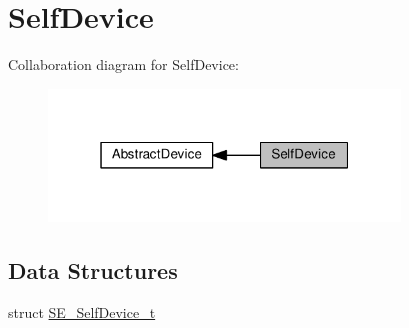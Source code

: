 \hypertarget{group__SelfDevice}{}\section{Self\+Device}
\label{group__SelfDevice}
Collaboration diagram for Self\+Device\+:\nopagebreak
\begin{figure}[H]
\begin{center}
\leavevmode
\includegraphics[width=265pt]{group__SelfDevice}
\end{center}
\end{figure}
\subsection*{Data Structures}
\begin{DoxyCompactItemize}
\item 
struct \hyperlink{structSE__SelfDevice__t}{S\+E\+\_\+\+Self\+Device\+\_\+t}
\end{DoxyCompactItemize}
